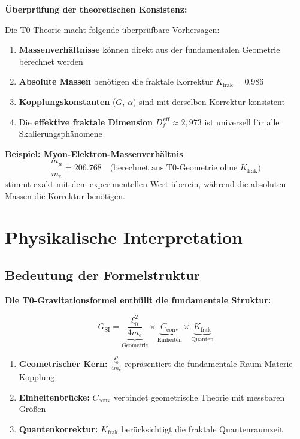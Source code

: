 	\begin{verification}
		\textbf{Überprüfung der theoretischen Konsistenz:}
		
		Die T0-Theorie macht folgende überprüfbare Vorhersagen:
		
		\begin{enumerate}
			\item \textbf{Massenverhältnisse} können direkt aus der fundamentalen Geometrie berechnet werden
			\item \textbf{Absolute Massen} benötigen die fraktale Korrektur $K_{\text{frak}} = 0.986$
			\item \textbf{Kopplungskonstanten} ($G$, $\alpha$) sind mit derselben Korrektur konsistent
			\item Die \textbf{effektive fraktale Dimension} $D_f^{\,\text{eff}} \approx 2{,}973$ ist universell für alle Skalierungsphänomene
		\end{enumerate}
		
		\textbf{Beispiel: Myon-Elektron-Massenverhältnis}
		\begin{equation}
			\frac{m_\mu}{m_e} = 206.768 \quad \text{(berechnet aus T0-Geometrie ohne $K_{\text{frak}}$)}
		\end{equation}
		stimmt exakt mit dem experimentellen Wert überein, während die absoluten Massen die Korrektur benötigen.
	\end{verification}
	
	\section{Physikalische Interpretation}
	
	\subsection{Bedeutung der Formelstruktur}
	
	\begin{keyresult}
		\textbf{Die T0-Gravitationsformel enthüllt die fundamentale Struktur:}
		
		\begin{equation}
			G_{\text{SI}} = \underbrace{\frac{\xi_0^2}{4 m_e}}_{\text{Geometrie}} \times \underbrace{C_{\text{conv}}}_{\text{Einheiten}} \times \underbrace{K_{\text{frak}}}_{\text{Quanten}}
		\end{equation}
		
		\begin{enumerate}
			\item \textbf{Geometrischer Kern:} $\frac{\xi_0^2}{4 m_e}$ repräsentiert die fundamentale Raum-Materie-Kopplung
			
			\item \textbf{Einheitenbrücke:} $C_{\text{conv}}$ verbindet geometrische Theorie mit messbaren Größen
			
			\item \textbf{Quantenkorrektur:} $K_{\text{frak}}$ berücksichtigt die fraktale Quantenraumzeit
		\end{enumerate}
	\end{keyresult}
	
